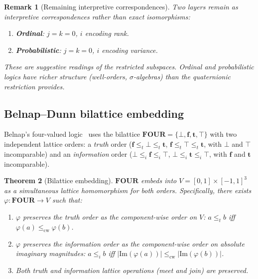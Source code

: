 \documentclass[11pt,a4paper]{article}
\newtheorem{theorem}{Theorem}
\newtheorem{remark}[theorem]{Remark}
\begin{document}
\begin{remark}[Remaining interpretive correspondences]
\label{rem:interpretive}
Two layers remain as interpretive correspondences rather than
exact isomorphisms:
\begin{enumerate}[nosep,start=5]
\item \textbf{Ordinal}: $j=k=0$, $i$ encoding rank.
\item \textbf{Probabilistic}: $j=k=0$, $i$ encoding variance.
\end{enumerate}
These are suggestive readings of the restricted subspaces. Ordinal
and probabilistic logics have richer structure (well-orders,
$\sigma$-algebras) than the quaternionic restriction provides.
\end{remark}

\subsection{Belnap--Dunn bilattice embedding}

Belnap's four-valued logic~\citep{belnap1977} uses the bilattice
$\mathbf{FOUR} = \{\bot, \mathbf{f}, \mathbf{t}, \top\}$ with two
independent lattice orders: a \emph{truth} order
($\mathbf{f} \leq_t \bot \leq_t \mathbf{t}$,
$\mathbf{f} \leq_t \top \leq_t \mathbf{t}$, with $\bot$ and $\top$
incomparable) and an \emph{information} order
($\bot \leq_i \mathbf{f} \leq_i \top$,
$\bot \leq_i \mathbf{t} \leq_i \top$, with $\mathbf{f}$ and
$\mathbf{t}$ incomparable).

\begin{theorem}[Bilattice embedding]
\label{thm:belnap}
$\mathbf{FOUR}$ embeds into $V = [0,1] \times [-1,1]^3$ as a
simultaneous lattice homomorphism for both orders. Specifically,
there exists $\varphi: \mathbf{FOUR} \to V$ such that:
\begin{enumerate}[nosep]
  \item $\varphi$ preserves the truth order as the component-wise
    order on $V$: $a \leq_t b$ iff $\varphi(a) \leq_{\mathrm{cw}}
    \varphi(b)$.
  \item $\varphi$ preserves the information order as the
    component-wise order on absolute imaginary magnitudes:
    $a \leq_i b$ iff $|\mathrm{Im}(\varphi(a))| \leq_{\mathrm{cw}}
    |\mathrm{Im}(\varphi(b))|$.
  \item Both truth and information lattice operations (meet and join)
    are preserved.
\end{enumerate}
\end{theorem}
\end{document}
